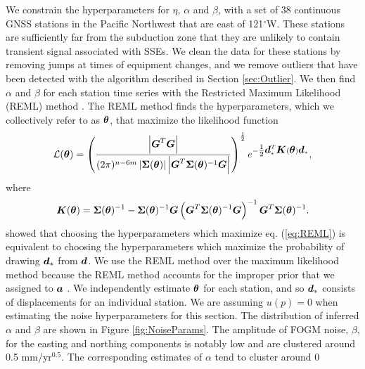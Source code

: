 \documentclass[extra,mreferee]{gji}
\begin{document}
We constrain the hyperparameters for $\eta$, $\alpha$ and $\beta$,
with a set of 38 continuous GNSS stations in the Pacific Northwest
that are east of 121$^\circ$W.  These stations are sufficiently far
from the subduction zone that they are unlikely to contain transient
signal associated with SSEs.  We clean the data for these stations by
removing jumps at times of equipment changes, and we remove outliers
that have been detected with the algorithm described in Section
\ref{sec:Outlier}. We then find $\alpha$ and $\beta$ for each station
time series with the Restricted Maximum Likelihood (REML) method
\cite[e.g.,][]{Harville1974,Cressie1992,Hines2017}. The REML method
finds the hyperparameters, which we collectively refer to as
$\mitbf{\theta}$, that maximize the likelihood function
\begin{equation}\label{eq:REML}
\mathcal{L}(\mitbf{\theta}) = \left(\frac{\left|\G^T\G\right|}{(2\pi)^{n-6m} 
                                    \left| \mitbf{\Sigma}(\mitbf{\theta}) \right| 
                                    \left| \G^T\mitbf{\Sigma}(\mitbf{\theta})^{-1}\G \right|}\right)^{\frac{1}{2}} 
                              e^{-\tfrac{1}{2}\data_*^T\mitbf{K}(\mitbf{\theta})\data_*},
\end{equation}
where
\begin{equation}
\mitbf{K}(\mitbf{\theta}) = \mitbf{\Sigma}(\mitbf{\theta})^{-1} - 
                            \mitbf{\Sigma}(\mitbf{\theta})^{-1}\G
                            \left(\G^T\mitbf{\Sigma}(\mitbf{\theta})^{-1}\G\right)^{-1}
                            \G^T\mitbf{\Sigma}(\mitbf{\theta})^{-1}.
\end{equation}
\citet{Harville1974} showed that choosing the hyperparameters which
maximize eq. (\ref{eq:REML}) is equivalent to choosing the
hyperparameters which maximize the probability of drawing $\data_*$
from $\data$. We use the REML method over the maximum likelihood
method \citep[e.g.,][]{Langbein1997} because the REML method accounts
for the improper prior that we assigned to $\mitbf{a}$
\citep{Hines2017}. We independently estimate $\mitbf{\theta}$ for each
station, and so $\data_*$ consists of displacements for an individual
station. We are assuming $u(p)=0$ when estimating the noise
hyperparameters for this section. The distribution of inferred
$\alpha$ and $\beta$ are shown in Figure \ref{fig:NoiseParams}. The
amplitude of FOGM noise, $\beta$, for the easting and northing
components is notably low and are clustered around 0.5 mm/yr$^{0.5}$.
The corresponding estimates of $\alpha$ tend to cluster around 0
\end{document}
